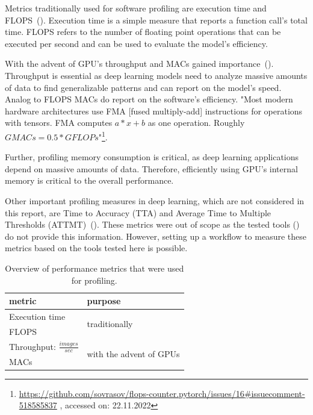 \documentclass[12pt, a4paper, hidelinks]{article}
\begin{document}
Metrics traditionally used for software profiling are execution time and \acf{FLOPS}~().
Execution time is a simple measure that reports a function call's total time.
\ac{FLOPS} refers to the number of floating point operations that can be executed per second and can be used to evaluate the model's efficiency.

With the advent of \ac{GPU}'s throughput and \acf{MACs} gained importance~(\cite{verma_2019_metrics-ml-benchmarking}).
Throughput is essential as deep learning models need to analyze massive amounts of data to find generalizable patterns and can report on the model's speed.
Analog to \ac{FLOPS} \ac{MACs} do report on the software's efficiency. "Most modern hardware architectures use FMA [fused multiply-add] instructions for operations with tensors. FMA computes $a*x+b$ as one operation. Roughly $GMACs = 0.5 * GFLOPs$"\footnote{\url{https://github.com/sovrasov/flops-counter.pytorch/issues/16\#issuecomment-518585837} , accessed on: 22.11.2022}.

Further, profiling memory consumption is critical, as deep learning applications depend on massive amounts of data. Therefore, efficiently using \ac{GPU}'s internal memory is critical to the overall performance.

Other important profiling measures in deep learning, which are not considered in this report, are Time to Accuracy (TTA) and Average Time to Multiple Thresholds (ATTMT)~(\cite{verma_2019_metrics-ml-benchmarking}). These metrics were out of scope as the tested tools () do not provide this information. However, setting up a workflow to measure these metrics based on the tools tested here is possible.

\begin{table}[H]
\centering
\begin{tabular}{@{}ll@{}}
\toprule
metric                                                                                 & purpose                        \\ \midrule
Execution time                                                                         & \multirow{2}{*}{traditionally} \\
FLOPS                                                                                  &                                \\ \midrule
Throughput: $\frac{images}{sec}$                                                       & \multirow{2}{*}{with the advent of GPUs} \\
MACs                                                                                   &                                \\ \bottomrule
\end{tabular}
\caption[Overview of performance metrics]{Overview of performance metrics that were used for profiling.}
\label{tab:metrics}
\end{table}
\end{document}
